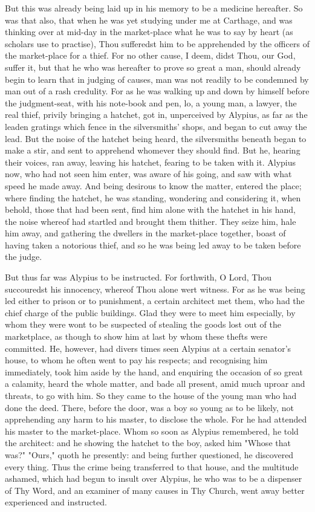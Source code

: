 \documentclass[b5paper,openright,12pt,twoside]{book}
\begin{document}
But this was already being laid up in his memory to be a medicine
hereafter. So was that also, that when he was yet studying under me at
Carthage, and was thinking over at mid-day in the market-place what he
was to say by heart (as scholars use to practise), Thou sufferedst him
to be apprehended by the officers of the market-place for a thief. For
no other cause, I deem, didst Thou, our God, suffer it, but that he who
was hereafter to prove so great a man, should already begin to learn
that in judging of causes, man was not readily to be condemned by man
out of a rash credulity. For as he was walking up and down by himself
before the judgment-seat, with his note-book and pen, lo, a young man, a
lawyer, the real thief, privily bringing a hatchet, got in, unperceived
by Alypius, as far as the leaden gratings which fence in the
silversmiths' shops, and began to cut away the lead. But the noise of
the hatchet being heard, the silversmiths beneath began to make a stir,
and sent to apprehend whomever they should find. But he, hearing their
voices, ran away, leaving his hatchet, fearing to be taken with it.
Alypius now, who had not seen him enter, was aware of his going, and
saw with what speed he made away. And being desirous to know the matter,
entered the place; where finding the hatchet, he was standing, wondering
and considering it, when behold, those that had been sent, find him
alone with the hatchet in his hand, the noise whereof had startled and
brought them thither. They seize him, hale him away, and gathering the
dwellers in the market-place together, boast of having taken a notorious
thief, and so he was being led away to be taken before the judge.

But thus far was Alypius to be instructed. For forthwith, O Lord, Thou
succouredst his innocency, whereof Thou alone wert witness. For as he
was being led either to prison or to punishment, a certain architect met
them, who had the chief charge of the public buildings. Glad they
were to meet him especially, by whom they were wont to be suspected of
stealing the goods lost out of the marketplace, as though to show him at
last by whom these thefts were committed. He, however, had divers times
seen Alypius at a certain senator's house, to whom he often went to pay
his respects; and recognising him immediately, took him aside by the
hand, and enquiring the occasion of so great a calamity, heard the whole
matter, and bade all present, amid much uproar and threats, to go with
him. So they came to the house of the young man who had done the
deed. There, before the door, was a boy so young as to be likely, not
apprehending any harm to his master, to disclose the whole. For he
had attended his master to the market-place. Whom so soon as Alypius
remembered, he told the architect: and he showing the hatchet to the
boy, asked him "Whose that was?" "Ours," quoth he presently: and being
further questioned, he discovered every thing. Thus the crime being
transferred to that house, and the multitude ashamed, which had begun
to insult over Alypius, he who was to be a dispenser of Thy Word, and an
examiner of many causes in Thy Church, went away better experienced and
instructed.
\end{document}
